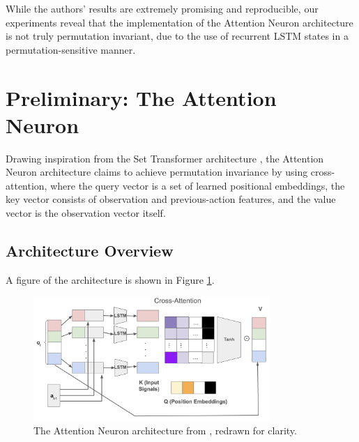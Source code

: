 \documentclass{article}
\begin{document}
While the authors' results \cite{Tang-and-Ha-2021} are extremely promising and reproducible, our experiments reveal 
that the implementation of the Attention Neuron architecture
is not truly permutation invariant, due to the use of recurrent LSTM states 
in a permutation-sensitive manner.

\section{Preliminary: The Attention Neuron}

Drawing inspiration from the Set Transformer architecture \cite{Lee-et-al-2019}, the Attention Neuron 
architecture claims to achieve permutation invariance by using cross-attention,
where the query vector is a set of learned positional embeddings, the key vector consists of observation 
and previous-action features, and the value vector is the observation vector itself.

\subsection{Architecture Overview}
A figure of the architecture is shown in Figure \ref{fig:attention_neuron_architecture}.
\begin{figure}[h]
    \centering
    \includegraphics[width=0.8\textwidth]{images/attention_neuron.png}
    \caption{The Attention Neuron architecture from \cite{Tang-and-Ha-2021}, redrawn for clarity.}
    \label{fig:attention_neuron_architecture}
\end{figure}
\end{document}
